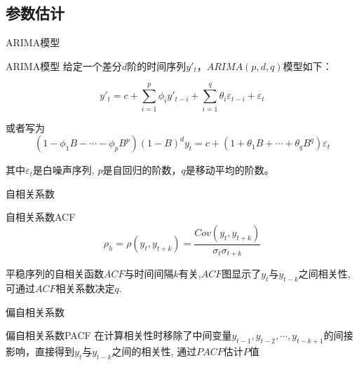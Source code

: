 \documentclass[10pt]{beamer}
\begin{document}
\subsection{参数估计}
\begin{frame}{ARIMA模型}
\begin{block}{ARIMA模型}
  给定一个差分\(d\)阶的时间序列\(y'_t\)，\(ARIMA(p,d,q)\)模型如下：

  \[y'_t=c+\sum_{i=1}^p{\phi_i y'_{t-i}}+\sum_{i=1}^q{\theta_i\varepsilon_{t-i}}+\varepsilon_t \]

  或者写为\[(1-\phi_1B - \cdots - \phi_p B^p)  (1-B)^d y_{t} = c + (1 + \theta_1 B + \cdots + \theta_q B^q)\varepsilon_t\]

  其中\(\varepsilon_t\)是白噪声序列, \(p\)是自回归的阶数，\(q\)是移动平均的阶数。
\end{block}
\end{frame}

\begin{frame}{自相关系数}
  \begin{block}{自相关系数ACF}
    \[\rho_h = \rho(y_t,y_{t+k}) =\frac{Cov(y_t,y_{t+k})}{\sigma_t \sigma_{t+k}}\]
  \end{block}

  平稳序列的自相关函数\(ACF\)与时间间隔\(k\)有关,\(ACF\)图显示了\(y_t\)与\(y_{t-k}\)之间相关性,
  可通过\(ACF\)相关系数决定\(q\).
\end{frame}

\begin{frame}{偏自相关系数}
  \begin{block}{偏自相关系数PACF}
    在计算相关性时移除了中间变量\(y_{t-1},
    y_{t-2},\cdots,y_{t-k+1}\)的间接影响，直接得到\(y_t\)与\(y_{t-k}\)之间的相关性,
    通过\(PACF\)估计\(P\)值
  \end{block}
\end{frame}
\end{document}
